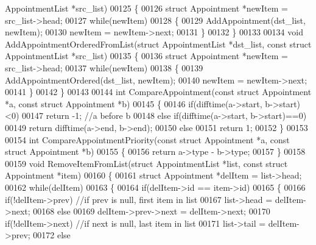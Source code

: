 \begin{DoxyCode}
      AppointmentList *src\_list)
00125 \{
00126     \textcolor{keyword}{struct }Appointment *newItem = src\_list->head;
00127     \textcolor{keywordflow}{while}(newItem)
00128     \{
00129         AddAppointment(dst\_list, newItem);
00130         newItem = newItem->next;
00131     \}
00132 \}
00133 
00134 \textcolor{keywordtype}{void} AddAppointmentOrderedFromList(\textcolor{keyword}{struct} AppointmentList *dst\_list, \textcolor{keyword}{const} \textcolor{keyword}{struct} 
      AppointmentList *src\_list)
00135 \{
00136     \textcolor{keyword}{struct }Appointment *newItem = src\_list->head;
00137     \textcolor{keywordflow}{while}(newItem)
00138     \{
00139         AddAppointmentOrdered(dst\_list, newItem);
00140         newItem = newItem->next;
00141     \}
00142 \}
00143 
00144 \textcolor{keywordtype}{int} CompareAppointment(\textcolor{keyword}{const} \textcolor{keyword}{struct} Appointment *a, \textcolor{keyword}{const} \textcolor{keyword}{struct} Appointment *b)
00145 \{
00146     \textcolor{keywordflow}{if}(difftime(a->start, b->start)<0)
00147         \textcolor{keywordflow}{return} -1;  \textcolor{comment}{//a before b}
00148     \textcolor{keywordflow}{else} \textcolor{keywordflow}{if}(difftime(a->start, b->start)==0)
00149         \textcolor{keywordflow}{return} difftime(a->end, b->end);
00150     \textcolor{keywordflow}{else}
00151         \textcolor{keywordflow}{return} 1;
00152 \}
00153 
00154 \textcolor{keywordtype}{int} CompareAppointmentPriority(\textcolor{keyword}{const} \textcolor{keyword}{struct} Appointment *a, \textcolor{keyword}{const} \textcolor{keyword}{struct} 
      Appointment *b)
00155 \{
00156     \textcolor{keywordflow}{return} a->type - b->type;
00157 \}
00158 
00159 \textcolor{keywordtype}{void} RemoveItemFromList(\textcolor{keyword}{struct} AppointmentList *list, \textcolor{keyword}{const} \textcolor{keyword}{struct} Appointment *item)
00160 \{
00161     \textcolor{keyword}{struct }Appointment *delItem = list->head;
00162     \textcolor{keywordflow}{while}(delItem)
00163     \{
00164         \textcolor{keywordflow}{if}(delItem->id == item->id)
00165         \{
00166             \textcolor{keywordflow}{if}(!delItem->prev)  \textcolor{comment}{//if prev is null, first item in list}
00167                 list->head = delItem->next;
00168             \textcolor{keywordflow}{else}
00169                 delItem->prev->next = delItem->next;
00170             \textcolor{keywordflow}{if}(!delItem->next)  \textcolor{comment}{//if next is null, last item in list}
00171                 list->tail = delItem->prev;
00172             \textcolor{keywordflow}{else}

\end{DoxyCode}
